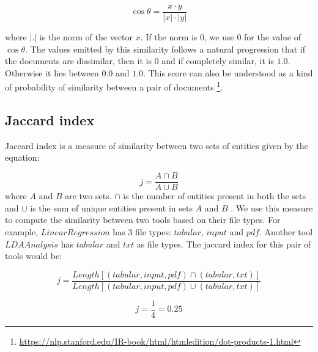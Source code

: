 \begin{equation}
\cos{\theta} = \frac {x \cdot y}{|x| \cdot |y|} 
\end{equation}

where $|.|$ is the norm of the vector $x$. If the norm is $0$, we use $0$ for the value of $\cos{\theta}$. The values emitted by this similarity follows a natural progression that if the documents are dissimilar, then it is $0$ and if completely similar, it is $1.0$. Otherwise it lies between $0.0$ and $1.0$. This score can also be understood as a kind of probability of similarity between a pair of documents \footnote{\url{https://nlp.stanford.edu/IR-book/html/htmledition/dot-products-1.html}}. 

\subsection{Jaccard index}
Jaccard index is a measure of similarity between two sets of entities given by the equation:

\begin{equation}
j = \frac{A \cap B}{A \cup B}
\end{equation}
where $A$ and $B$ are two sets. $\cap$ is the number of entities present in both the sets and $\cup$ is the sum of unique entities present in sets $A$ and $B$ \cite{Ivchenko1998}. We use this measure to compute the similarity between two tools based on their file types. For example, $LinearRegression$ has 3 file types: $tabular$, $input$ and $pdf$. Another tool $LDAAnalysis$ has $tabular$ and $txt$ as file types. The jaccard index for this pair of tools would be:

\begin{equation}
j = \frac{Length[(tabular, input, pdf) \cap (tabular, txt)]}{Length[(tabular, input, pdf) \cup (tabular, txt)]}
\end{equation}

\begin{equation}
j = \frac{1}{4} = 0.25
\end{equation}



